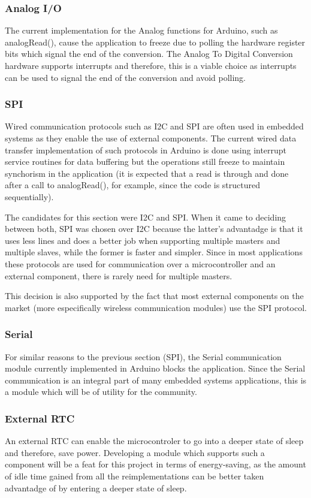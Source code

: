 \documentclass{article}
\begin{document}
\subsubsection{Analog I/O}
\tab The current implementation for the Analog functions for Arduino, such as analogRead(), cause the application to freeze due to polling the hardware register bits which signal the end of the conversion. The Analog To Digital Conversion hardware supports interrupts and therefore, this is a viable choice as interrupts can be used to signal the end of the conversion and avoid polling.
\subsubsection{SPI}
\tab Wired communication protocols such as I2C and SPI are often used in embedded systems as they enable the use of external components. The current wired data transfer implementation of such protocols in Arduino is done using interrupt service routines for data buffering but the operations still freeze to maintain synchorism in the application (it is expected that a read is through and done after a call to analogRead(), for example, since the code is structured sequentially).
\par The candidates for this section were I2C and SPI. When it came to deciding between both, SPI was chosen over I2C because the latter's advantadge is that it uses less lines and does a better job when supporting multiple masters and multiple slaves, while the former is faster and simpler. Since in most applications these protocols are used for communication over a microcontroller and an external component, there is rarely need for multiple masters. 
\par This decision is also supported by the fact that most external components on the market (more especifically wireless communication modules) use the SPI protocol.
\subsubsection{Serial}
\tab For similar reasons to the previous section (SPI), the Serial communication module currently implemented in Arduino blocks the application. Since the Serial communication is an integral part of many embedded systems applications, this is a module which will be of utility for the community.
\subsubsection{External RTC}
\tab An external RTC can enable the microcontroler to go into a deeper state of sleep and therefore, save power. Developing a module which supports such a component will be a feat for this project in terms of energy-saving, as the amount of idle time gained from all the reimplementations can be better taken advantadge of by entering a deeper state of sleep.
\end{document}
